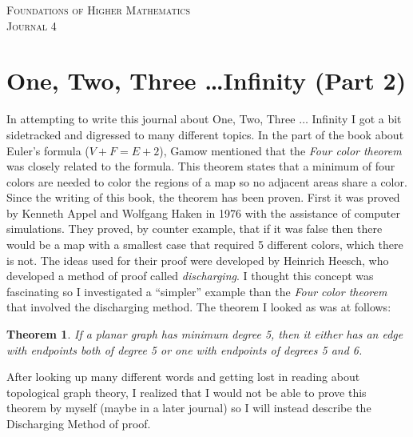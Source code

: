 \documentclass{article}
\newtheorem*{thm}{Theorem}
\begin{document}

\begin{center}
\textsc{\Large Foundations of Higher Mathematics}\\[.3cm]
\textsc{\Large Journal 4}\\[1cm]
\end{center}


\section*{One, Two, Three \ldots Infinity (Part 2)}
In attempting to write this journal about One, Two, Three $\ldots$ Infinity I got a bit sidetracked and digressed to many different topics. In the part of the book about Euler's formula ($V+F=E+2$), Gamow mentioned that the \textit{Four color theorem} was closely related to the formula. This theorem states that a minimum of four colors are needed to color the regions of a map so no adjacent areas share a color. Since the writing of this book, the theorem has been proven. First it was proved by Kenneth Appel and Wolfgang Haken in 1976 with the assistance of computer simulations. They proved, by counter example, that if it was false then there would be a map with a smallest case that required 5 different colors, which there is not. The ideas used for their proof were developed by Heinrich Heesch, who developed a method of proof called \textit{discharging}. I thought this concept was fascinating so I investigated a ``simpler'' example than the \textit{Four color theorem} that involved the discharging method. The theorem I looked as was at follows:

\begin{thm}
If a planar graph has minimum degree 5, then it either has an edge with endpoints both of degree 5 or one with endpoints of degrees 5 and 6.
\end{thm}

After looking up many different words and getting lost in reading about topological graph theory, I realized that I would not be able to prove this theorem by myself (maybe in a later journal) so I will instead describe the Discharging Method of proof.
\end{document}
